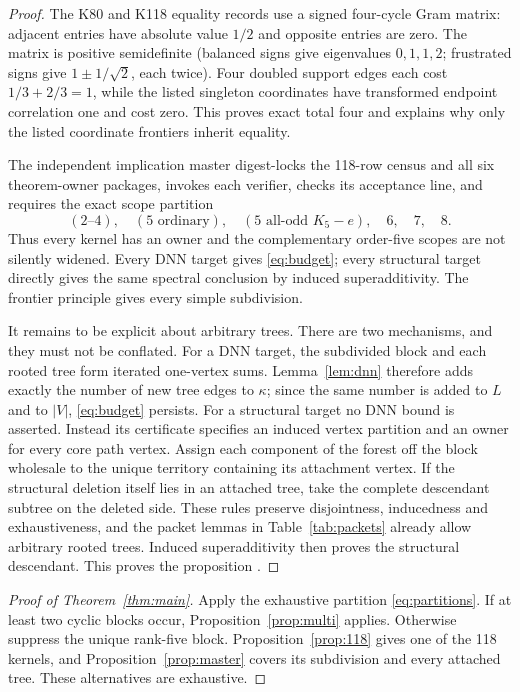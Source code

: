 \documentclass[11pt]{article}
\theoremstyle{remark}
\newcommand{\kap}{\kappa}
\begin{document}
\begin{proof}
The K80 and K118 equality records use a signed four-cycle Gram matrix: adjacent
entries have absolute value $1/2$ and opposite entries are zero.  The matrix is
positive semidefinite (balanced signs give eigenvalues $0,1,1,2$; frustrated
signs give $1\pm1/\sqrt2$, each twice).  Four doubled support edges each cost
$1/3+2/3=1$, while the listed singleton coordinates have transformed endpoint
correlation one and cost zero.  This proves exact total four and explains why
only the listed coordinate frontiers inherit equality.

The independent implication master digest-locks the 118-row census and all six
theorem-owner packages, invokes each verifier, checks its acceptance line, and
requires the exact scope partition
\[
 (2\text{--}4),\quad(5\text{ ordinary}),\quad(5\text{ all-odd }K_5-e),
 \quad6,\quad7,\quad8.
\]
Thus every kernel has an owner and the complementary order-five scopes are not
silently widened.  Every DNN target gives \eqref{eq:budget}; every structural
target directly gives the same spectral conclusion by induced
superadditivity.  The frontier principle gives every simple subdivision.

It remains to be explicit about arbitrary trees.  There are two mechanisms,
and they must not be conflated.  For a DNN target, the subdivided block and each
rooted tree form iterated one-vertex sums.  Lemma~\ref{lem:dnn} therefore adds
exactly the number of new tree edges to $\kap$; since the same number is added
to $L$ and to $|V|$, \eqref{eq:budget} persists.  For a structural target no
DNN bound is asserted.  Instead its certificate specifies an induced vertex
partition and an owner for every core path vertex.  Assign each component of
the forest off the block wholesale to the unique territory containing its
attachment vertex.  If the structural deletion itself lies in an attached
tree, take the complete descendant subtree on the deleted side.  These rules
preserve disjointness, inducedness and exhaustiveness, and the packet lemmas in
Table~\ref{tab:packets} already allow arbitrary rooted trees.  Induced
superadditivity then proves the structural descendant.  This proves the
proposition \cite{RankFiveMaster}.
\end{proof}

\begin{proof}[Proof of Theorem~\ref{thm:main}]
Apply the exhaustive partition \eqref{eq:partitions}.  If at least two cyclic
blocks occur, Proposition~\ref{prop:multi} applies.  Otherwise suppress the
unique rank-five block.  Proposition~\ref{prop:118} gives one of the 118
kernels, and Proposition~\ref{prop:master} covers its subdivision and every
attached tree.  These alternatives are exhaustive.
\end{proof}
\end{document}
